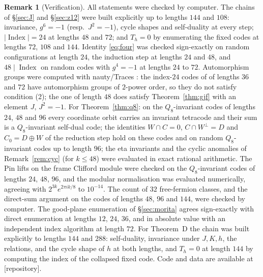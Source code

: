 \documentclass[11pt]{amsart}
\theoremstyle{definition}
\newtheorem{remark}[theorem]{Remark}
\newcommand{\Index}{\operatorname{Index}}
\begin{document}
\begin{remark}[Verification]
All statements were checked by computer. The chains of \S\ref{sec:J} and \S\ref{sec:z12} were built
explicitly up to lengths $144$ and $108$: invariance, $g^6=-1$ (resp.\ $J^2=-1$), cycle shapes and
self-duality at every step; $|\Index|=24$ at lengths $48$ and $72$; and $T_h=0$ by enumerating the
fixed codes at lengths $72$, $108$ and $144$. Identity \eqref{eq:four} was checked sign-exactly on random configurations at length $24$, the
induction step at lengths $24$ and $48$, and $48\mid\Index$ on random codes with $g^4=-1$ at lengths
$24$ to $72$.
Automorphism groups were computed with nauty/Traces \cite{nauty}: the index-$24$ codes of \cite{BR}
of lengths $36$ and $72$ have automorphism groups of $2$-power order, so they do not satisfy
condition (2); the one of length $48$ does satisfy Theorem~\ref{thm:gjf} with an element $J$,
$J^2=-1$. For Theorem~\ref{thm:q8}: on the $Q_8$-invariant codes of lengths $24$, $48$ and $96$
every coordinate orbit carries an invariant tetracode and their sum is a $Q_8$-invariant self-dual
code; the identities $W\cap C=0$, $C\cap W^\perp=D$ and $C_0=D\oplus W$ of the reduction step hold on
these codes and on random $Q_8$-invariant codes up to length $96$; the eta invariants and the cyclic anomalies of
Remark~\ref{rem:cyc} (for $k\le48$) were evaluated in exact rational arithmetic. The Pin lifts on the frame Clifford
module were checked on the $Q_8$-invariant codes of lengths $24$, $48$, $96$, and the modular normalisation was
evaluated numerically, agreeing with $2^{3k}e^{2\pi ik/8}$ to $10^{-14}$. The count of $32$ free-fermion classes, and the direct-sum argument on
the codes of lengths $48$, $96$ and $144$, were checked by computer. The good-plane enumeration of
\S\ref{sec:morita} agrees sign-exactly with direct enumeration at lengths $12$, $24$, $36$, and in absolute
value with an independent index algorithm at length $72$. For Theorem~D the chain was built explicitly to
lengths $144$ and $288$: self-duality, invariance under $J,K,h$, the relations, and the cycle shape of $h$
at both lengths, and $T_h=0$ at length $144$ by computing the index of the collapsed fixed code. Code and
data are available at [repository].
\end{remark}

\appendix
\end{document}
